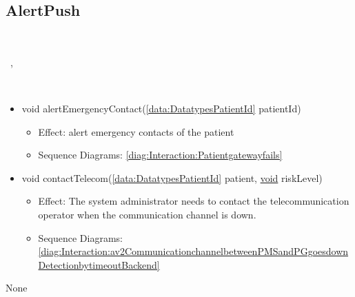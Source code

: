   \subsection{AlertPush}\label{int:InterfacesAlertPush}
    \begin{description}
      \item[Provided by:] \iconcomponent{}~
      \item[Required by:] \iconcomponent{}~, \iconcomponent{}~ 
      \item[Operations:] ~
    \begin{itemize}[noitemsep,nolistsep,leftmargin=-.25cm]
      \item \textsf{void alertEmergencyContact(\ref{data:DatatypesPatientId} patientId)}
        \begin{itemize}[noitemsep,nolistsep]
           \item Effect: alert emergency contacts of the patient 
           \item Sequence Diagrams: \cref{diag:Interaction:Patientgatewayfails}
        \end{itemize}
      \item \textsf{void contactTelecom(\ref{data:DatatypesPatientId} patient, {\colorbox{red!30}{\underline{void}}} riskLevel)}
        \begin{itemize}[noitemsep,nolistsep]
           \item Effect: The system administrator needs to contact the telecommunication operator when the communication channel is down. 
           \item Sequence Diagrams: \cref{diag:Interaction:av2CommunicationchannelbetweenPMSandPGgoesdownDetectionbytimeoutBackend}
        \end{itemize}
    \end{itemize}
      \item[Diagrams:] None
    \end{description}

